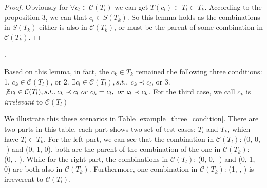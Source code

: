 \documentclass{sig-alternate}
\begin{document}
\begin{proof}
Obviously for $\forall c_{l} \in \mathcal{C}(T_{l}) $ we can get $T(c_{l}) \subset T_{l} \subset T_{k}$. According to the proposition 3, we can that $c_{l} \in S(T_{k})$. So this lemma holds as the combinations in $S(T_{k})$ either is also in $\mathcal{C}(T_{k})$, or must be the parent of some combination in $\mathcal{C}(T_{k})$.
\end{proof}.


Based on this lemma, in fact, the $c_{k} \in T_{k}$  remained the following three conditions: 1. $c_{k} \in \mathcal{C}(T_{l})$, or 2. $\exists c_{l} \in \mathcal{C}(T_{l}), s.t.,\ c_{k} \prec c_{l}$, or 3. $\not\exists c_{l} \in \mathcal{C}(T_{l}), s.t., c_{k} \prec c_{l}\ or\ c_{k} = c_{l},\ or\ c_{l} \prec c_{k}$. For the third case, we call $c_{k}$ is \emph{irrelevant} to $\mathcal{C}(T_{l})$

We illustrate this these scenarios in Table \ref{example_three_condition}. There are two parts in this table, each part shows two set of test cases: $T_{l}$ and $T_{k}$, which have $T_{l} \subset T_{k}$. For the left part, we can see that the combination in $\mathcal{C}(T_{l})$: (0, 0, -) and (0, 1, 0), both are the parent of the combination of the one in $\mathcal{C}(T_{k})$:(0,-,-). While for the right part, the combinations in $\mathcal{C}(T_{l})$: (0, 0, -) and (0, 1, 0) are both also in $\mathcal{C}(T_{k})$. Furthermore, one combination in $\mathcal{C}(T_{k})$: (1,-,-) is irreverent to $\mathcal{C}(T_{l})$.


%
\end{document}
